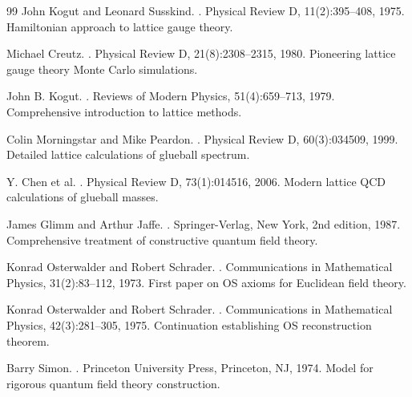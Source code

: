 \documentclass[12pt]{article}
\begin{document}
\begin{thebibliography}{99}
John Kogut and Leonard Susskind.
.
\newblock Physical Review D, 11(2):395--408, 1975.
\newblock Hamiltonian approach to lattice gauge theory.

Michael Creutz.
.
\newblock Physical Review D, 21(8):2308--2315, 1980.
\newblock Pioneering lattice gauge theory Monte Carlo simulations.

John B. Kogut.
.
\newblock Reviews of Modern Physics, 51(4):659--713, 1979.
\newblock Comprehensive introduction to lattice methods.

Colin Morningstar and Mike Peardon.
.
\newblock Physical Review D, 60(3):034509, 1999.
\newblock Detailed lattice calculations of glueball spectrum.

Y. Chen et al.
.
\newblock Physical Review D, 73(1):014516, 2006.
\newblock Modern lattice QCD calculations of glueball masses.

James Glimm and Arthur Jaffe.
.
\newblock Springer-Verlag, New York, 2nd edition, 1987.
\newblock Comprehensive treatment of constructive quantum field theory.

Konrad Osterwalder and Robert Schrader.
.
\newblock Communications in Mathematical Physics, 31(2):83--112, 1973.
\newblock First paper on OS axioms for Euclidean field theory.

Konrad Osterwalder and Robert Schrader.
.
\newblock Communications in Mathematical Physics, 42(3):281--305, 1975.
\newblock Continuation establishing OS reconstruction theorem.

Barry Simon.
.
\newblock Princeton University Press, Princeton, NJ, 1974.
\newblock Model for rigorous quantum field theory construction.


\end{thebibliography}
\end{document}
